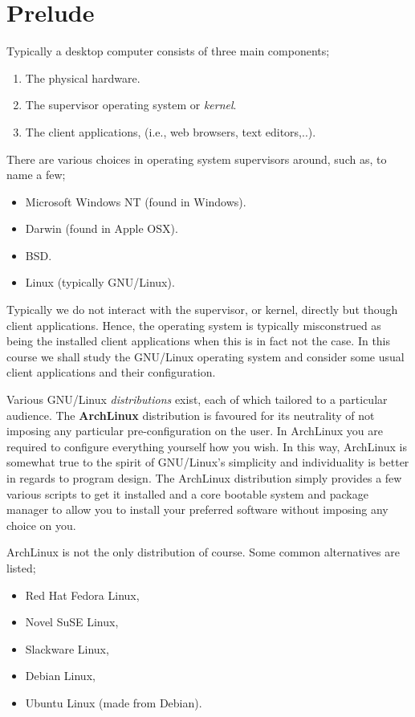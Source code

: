 
\section{Prelude} %
\label{sec:prelude}

Typically a desktop computer consists of three main components;
\begin{enumerate}
	\item The physical hardware.
	\item The supervisor operating system or \emph{kernel}.
	\item The client applications, (i.e., web browsers, text editors,..).
\end{enumerate}

There are various choices in operating system supervisors around, such as,
to name a few;
\begin{itemize}
	\item Microsoft Windows NT (found in Windows).
	\item Darwin (found in Apple OSX).
	\item BSD.
	\item Linux (typically GNU/Linux).
\end{itemize}

Typically we do not interact with the supervisor, or kernel, directly but
though client applications. Hence, the operating system is typically
misconstrued as being the installed client applications when this is
in fact not the case. In this course we shall study the GNU/Linux
operating system and consider some usual client applications and their
configuration.

Various GNU/Linux \emph{distributions} exist, each of which tailored
to a particular audience. The \textbf{ArchLinux} distribution is
favoured for its neutrality of not imposing any particular pre-configuration
on the user. In ArchLinux you are required to configure everything yourself
how you wish. In this way, ArchLinux is somewhat true to the spirit of
GNU/Linux's simplicity and individuality is better in regards to program
design. The ArchLinux distribution simply provides a few various scripts
to get it installed and a core bootable system and package manager to allow
you to install your preferred software without imposing any choice on you.

\begin{exmp}
	ArchLinux is not the only distribution of course. Some common
	alternatives are listed;
	\begin{itemize}
		\item Red Hat Fedora Linux,
		\item Novel SuSE Linux,
		\item Slackware Linux,
		\item Debian Linux,
		\item Ubuntu Linux (made from Debian).
	\end{itemize}
\end{exmp}
